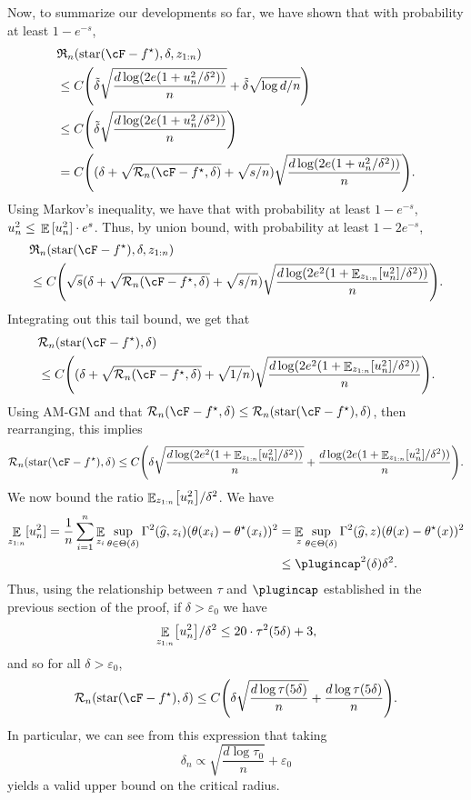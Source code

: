 \documentclass[11pt]{article} %
\theoremstyle{theorem}  %
\theoremstyle{plain}
\DeclarePairedDelimiter{\brk}{[}{]}
\DeclarePairedDelimiter{\prn}{(}{)}
\DeclareMathOperator{\En}{\mathbb{E}}
\newcommand{\veps}{\varepsilon}
\newcommand{\wh}[1]{\widehat{#1}}
\newcommand{\zr}[1][n]{z_{1:#1}}
\newcommand{\Rad}{\mathfrak{R}_{n}}
\newcommand{\Radexp}{\mathcal{R}_n}
\newcommand{\starhull}{\mathrm{star}}
\newcommand{\estone}{\wh{g}}
\newcommand{\target}{\Theta}
\begin{document}
Now, to summarize our developments so far, we have shown that with probability at least $1-e^{-s}$,
\begin{align*}
&\Rad(\starhull(\cF-f^{\star}),\delta,\zr[n])\\
&\leq{}C\prn*{
\tilde{\delta}\sqrt{\frac{d\log(2e(1+u_{n}^{2}/\delta^{2}))}{n}}
+
\tilde{\delta}\sqrt{\log{}d/n}
} \\
&\leq{}C\prn*{
\tilde{\delta}\sqrt{\frac{d\log(2e(1+u_{n}^{2}/\delta^{2}))}{n}}
%
%
} \\
&=C\prn*{
(\delta+\sqrt{\Radexp(\cF-f^{\star},\delta)}+\sqrt{s/n})\sqrt{\frac{d\log(2e(1+u_{n}^{2}/\delta^{2}))}{n}}
%
%
}.
\end{align*}
Using Markov's inequality, we have that with probability at least $1-e^{-s}$, $u_{n}^{2}\leq{}\En{}\brk{u_n^{2}}\cdot{}e^{s}$. Thus, by union bound, with probability at least $1-2e^{-s}$,
\begin{align*}
&\Rad(\starhull(\cF-f^{\star}),\delta,\zr[n])\\
&\leq{}C\prn*{
\sqrt{s}(\delta+\sqrt{\Radexp(\cF-f^{\star},\delta)}+\sqrt{s/n})\sqrt{\frac{d\log(2e^{2}(1+\En_{\zr[n]}\brk{u_{n}^{2}}/\delta^{2}))}{n}}
%
%
}.
\end{align*}
Integrating out this tail bound, we get that
\begin{align*}
&\Radexp(\starhull(\cF-f^{\star}),\delta)\\
&\leq{}C\prn*{
(\delta+\sqrt{\Radexp(\cF-f^{\star},\delta)}+\sqrt{1/n})\sqrt{\frac{d\log(2e^{2}(1+\En_{\zr[n]}\brk{u_{n}^{2}}/\delta^{2}))}{n}}
%
%
}.
\end{align*}
Using AM-GM and that $\Radexp(\cF-f^{\star},\delta)\leq\Radexp(\starhull(\cF-f^{\star}),\delta)$, then rearranging, this implies
\begin{align*}
\Radexp(\starhull(\cF-f^{\star}),\delta) \leq{}
C\prn*{
\delta\sqrt{\frac{d\log(2e^{2}(1+\En_{\zr[n]}\brk{u_{n}^{2}}/\delta^{2}))}{n}}
+
\frac{d\log(2e(1+\En_{\zr[n]}\brk{u_{n}^{2}}/\delta^{2}))}{n}}.
\end{align*}
We now bound the ratio $\En_{\zr[n]}\brk*{u_{n}^{2}}/\delta^{2}$. We have
\begin{align*}
\En_{\zr[n]}\brk{u_{n}^{2}}=\frac{1}{n}\sum_{i=1}^{n}\En_{z_i}\sup_{\theta\in\target(\delta)}\Gamma^{2}(\estone,z_i)(\theta(x_i)-\theta^{\star}(x_i))^{2}
&=\En_{z}\sup_{\theta\in\target(\delta)}\Gamma^{2}(\estone,z)(\theta(x)-\theta^{\star}(x))^{2}
\\&\leq{}\plugincap^{2}(\delta)\delta^{2}.
\end{align*}
Thus, using the relationship between $\tau$ and $\plugincap$ established in the previous section of the proof, if $\delta>\veps_0$ we have
\[
\En_{\zr[n]}\brk*{u_{n}^{2}}/\delta^{2}\leq{}20\cdot\tau^{2}(5\delta) + 3,
\]
and so for all $\delta>\veps_0$,
\[
\Radexp(\starhull(\cF-f^{\star}),\delta) \leq{}
C\prn*{
\delta\sqrt{\frac{d\log\tau(5\delta)}{n}}
+
\frac{d\log\tau(5\delta)}{n}}.
\]
In particular, we can see from this expression that taking
\[
\delta_n\propto\sqrt{\frac{d\log\tau_0}{n}}+\veps_0
\]
yields a valid upper bound on the critical radius.
\end{document}
